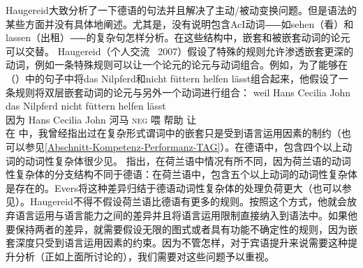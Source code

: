 \begin{exe}
\begin{xlist}[iv.]
\begin{exe}
\begin{xlist}[iv.]
Haugereid大致分析了一下德语的句法并且解决了主动/被动变换问题。但是语法的某些方面并没有具体地阐述。尤其是，没有说明包含AcI动词⸺如sehen（看）和lassen（出租）⸺的复杂句怎样分析。在这些结构中，嵌套和被嵌套动词的论元可以交替。 Haugereid（个人交流 \, 2007）假设了特殊的规则允许渗透嵌套更深的动词，例如一条特殊规则可以让一个论元的论元与动词组合。例如，为了能够在（）中的句子中将das Nilpferd和nicht füttern helfen lässt组合起来，他假设了一条规则将双层嵌套动词的论元与另外一个动词进行组合：
\ea
\label{ex-nilpferd-fuettern-helfen-laesst}
\gll weil    Hans Cecilia John das Nilpferd nicht füttern helfen lässt\\
     因为 Hans Cecilia John  河马 \textsc{neg} 喂 帮助 让\\
\z
在 \citet[]{Mueller2004b}中，我曾经指出过在复杂形式谓词中的嵌套只是受到语言运用因素的制约（也可以参见\ref{Abschnitt-Kompetenz-Performanz-TAG}）。在德语中，包含四个以上动词的动词性复杂体很少见。 \citet[--59]{Evers75a}指出，在荷兰语中情况有所不同，因为荷兰语的动词性复杂体的分支结构不同于德语：在荷兰语中，包含五个以上动词的动词性复杂体是存在的。Evers将这种差异归结于德语动词性复杂体的处理负荷更大（也可以参见\citet[\S~3.7]{Gibson98a}）。Haugereid不得不假设荷兰语比德语有更多的规则。按照这个方式，他就会放弃语言运用与语言能力之间的差异并且将语言运用限制直接纳入到语法中。如果他要保持两者的差异，就需要假设无限的图式或者具有功能不确定性的规则，因为嵌套深度只受到语言运用因素的约束\citep{HN94a}。因为不管怎样，对于宾语提升来说需要这种提升分析（正如上面所讨论的），我们需要对这些问题予以重视。

\end{xlist}
\end{exe}
\end{xlist}
\end{exe}
